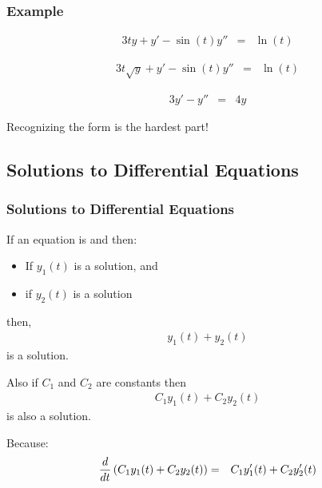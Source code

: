 \begin{frame}
  \frametitle{Example}

  \vspace*{-3em}
  \begin{eqnarray*}
    3t y + y' - \sin(t) y'' & = & \ln(t)
  \end{eqnarray*}
  \centerline{}

  \begin{eqnarray*}
    3t \sqrt{y} + y' - \sin(t) y'' & = & \ln(t)
  \end{eqnarray*}
  \centerline{}

  \begin{eqnarray*}
    3 y' -y'' & = & 4 y
  \end{eqnarray*}
  \centerline{}

  Recognizing the form is the hardest part!

\end{frame}

\subsection{Solutions to Differential Equations}

\begin{frame}
  \frametitle{Solutions to Differential Equations}

  If an equation is  and  then:
  \begin{itemize}
  \item If $y_1(t)$ is a solution, and
  \item if $y_2(t)$ is a solution
  \end{itemize}

  then,
  \begin{eqnarray*}
    y_1(t) + y_2(t)
  \end{eqnarray*}
  is a solution.

  Also if $C_1$ and $C_2$ are constants then
  \begin{eqnarray*}
    C_1 y_1(t) + C_2 y_2(t)
  \end{eqnarray*}
  is also a solution.

  Because:
  \begin{eqnarray*}
    \frac{d}{dt} \left( C_1 y_1(t) + C_2 y_2(t) \right) & = &
    C_1 y_1'(t) + C_2 y_2'(t)
  \end{eqnarray*}


\end{frame}


